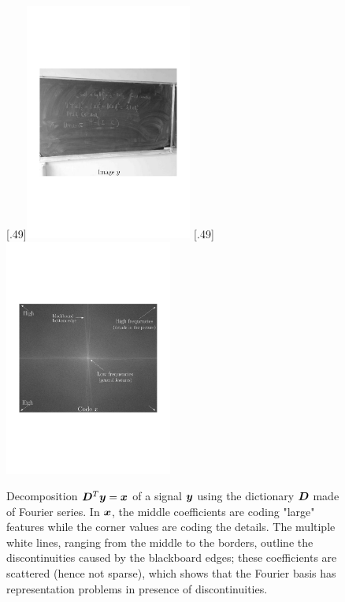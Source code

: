 \begin{figure}[!ht]
%
  [.49\linewidth]{\includegraphics[width=0.49\textwidth]{figures/exple_fourier_spacial.pdf}}
  [.49\linewidth]{\includegraphics[width=0.49\textwidth]{figures/exple_fourier_frequen.pdf}}
  \caption{Decomposition $\bm D^T\bm y=\bm x$ of a signal $\bm y$ using the dictionary $\bm D$ made of Fourier series. In $\bm x$, the middle coefficients are coding "large" features while the corner values are coding the details. The multiple white lines, ranging from the middle to the borders, outline the discontinuities caused by the blackboard edges; these coefficients are scattered (hence not sparse), which shows that the Fourier basis has representation problems in presence of discontinuities.} \label{fig_fourier}
\end{figure}

